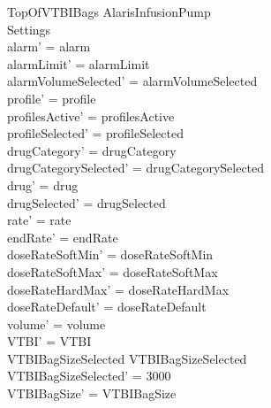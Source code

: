 \begin{schema}{TopOfVTBIBags}
	\Delta AlarisInfusionPump\\
	Settings\\
	\where
	alarm' = alarm\\
	alarmLimit' = alarmLimit\\
	alarmVolumeSelected' = alarmVolumeSelected\\
	profile' = profile\\
	profilesActive' = profilesActive\\  
	  profileSelected' = profileSelected\\
	drugCategory' = drugCategory\\ drugCategorySelected' = drugCategorySelected\\
	drug' = drug\\ drugSelected' = drugSelected\\
	rate' = rate\\
	endRate' = endRate\\
	doseRateSoftMin' = doseRateSoftMin\\
	doseRateSoftMax' = doseRateSoftMax\\
	doseRateHardMax' = doseRateHardMax\\
	doseRateDefault' = doseRateDefault\\
	volume' = volume\\
	VTBI' = VTBI\\
	VTBIBagSizeSelected  \land VTBIBagSizeSelected \\
	\pagebreak
	VTBIBagSizeSelected' = 3000\\
	VTBIBagSize' = VTBIBagSize\\

\end{schema}
